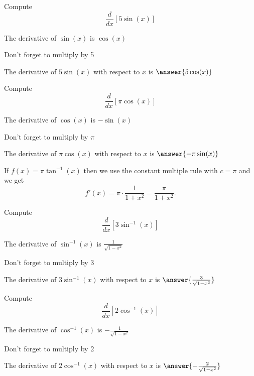 \documentclass[handout]{ximera}
\begin{document}
\begin{problem} %
  Compute 
  \[
  \frac{d}{dx} \left[5\sin(x)\right]
  \]
  
    \begin{hint}
      The derivative of $\sin(x)$ is $\cos(x)$
    \end{hint}
		\begin{hint}
		  Don't forget to multiply by 5
		\end{hint}
		The derivative of $5\sin(x)$ with respect to $x$ is
		 $\answer{5\cos(x)}$
	
\end{problem}


\begin{problem} %
  Compute 
  \[
  \frac{d}{dx} \left[\pi\cos(x)\right]
  \]
  
    \begin{hint}
      The derivative of $\cos(x)$ is $-\sin(x)$
    \end{hint}
		\begin{hint}
		  Don't forget to multiply by $\pi$
		\end{hint}
		
		The derivative of $\pi\cos(x)$ with respect to $x$ is
		 $\answer{-\pi\sin(x)}$
	
\end{problem}


\begin{example} %
 If $f(x) = \pi\tan^{-1}(x)$ then we use the constant multiple rule with $c = \pi$ and we get 
\[
f'(x) =  \pi \cdot \frac{1}{1+x^2}= \frac{\pi}{1+x^2}.
\]
\end{example}

\begin{problem} %
  Compute 
  \[
  \frac{d}{dx} \left[3\sin^{-1}(x)\right]
  \]
  
    \begin{hint}
      The derivative of $\sin^{-1}(x)$ is $\frac{1}{\sqrt{1-x^2}}$
    \end{hint} 
		\begin{hint}
		  Don't forget to multiply by 3
		\end{hint}
		
		The derivative of $3\sin^{-1}(x)$ with respect to $x$ is
		 $\answer{\frac{3}{\sqrt{1-x^2}}}$
	
\end{problem}

\begin{problem} %
  Compute 
  \[
  \frac{d}{dx} \left[2\cos^{-1}(x)\right]
  \]
  
    \begin{hint}
      The derivative of $\cos^{-1}(x)$ is $-\frac{1}{\sqrt{1-x^2}}$
    \end{hint}
		\begin{hint}
		  Don't forget to multiply by 2
		\end{hint}
		The derivative of $2\cos^{-1}(x)$ with respect to $x$ is
		 $\answer{-\frac{2}{\sqrt{1-x^2}}}$
	
\end{problem}
\end{document}
